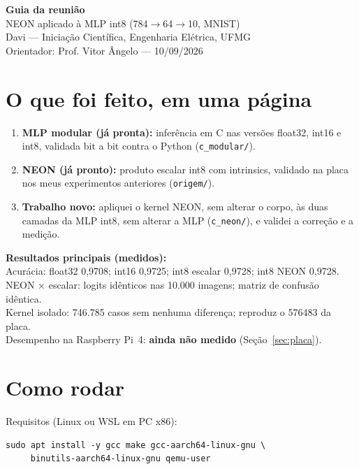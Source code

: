 \documentclass[10pt]{article}
\newcommand{\destaque}[1]{\par\smallskip\colorbox{caixa}{\parbox{\dimexpr\linewidth-2\fboxsep}{#1}}\par\smallskip}
\begin{document}
\begin{center}
{\Large\bfseries Guia da reunião}\\[0.3em]
{\large NEON aplicado à MLP int8 (784$\to$64$\to$10, MNIST)}\\[0.4em]
Davi --- Iniciação Científica, Engenharia Elétrica, UFMG\\
Orientador: Prof. Vitor Ângelo --- 10/09/2026
\end{center}

\tableofcontents

\section{O que foi feito, em uma página}

\begin{enumerate}
\item \textbf{MLP modular (já pronta):} inferência em C nas versões float32, int16 e int8, validada
      bit a bit contra o Python (\texttt{c\_modular/}).
\item \textbf{NEON (já pronto):} produto escalar int8 com intrinsics, validado na placa nos meus
      experimentos anteriores (\texttt{origem/}).
\item \textbf{Trabalho novo:} apliquei o kernel NEON, sem alterar o corpo, às duas camadas da MLP int8, sem
      alterar a MLP (\texttt{c\_neon/}), e validei a correção e a medição.
\end{enumerate}

\destaque{\textbf{Resultados principais (medidos):}\\
Acurácia: float32 0,9708; int16 0,9725; int8 escalar 0,9728; int8 NEON 0,9728.\\
NEON $\times$ escalar: logits idênticos nas 10.000 imagens; matriz de confusão idêntica.\\
Kernel isolado: 746.785 casos sem nenhuma diferença; reproduz o 576483 da placa.\\
Desempenho na Raspberry Pi~4: \textbf{ainda não medido} (Seção~\ref{sec:placa}).}

\section{Como rodar}

Requisitos (Linux ou WSL em PC x86):
\begin{lstlisting}
sudo apt install -y gcc make gcc-aarch64-linux-gnu \
     binutils-aarch64-linux-gnu qemu-user
\end{lstlisting}
\end{document}
